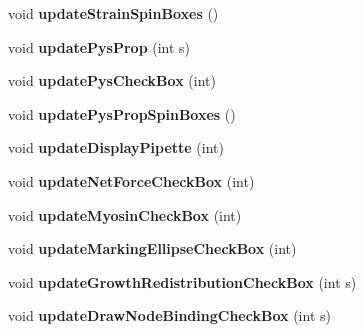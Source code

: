 \begin{DoxyCompactItemize}
\item 
\hypertarget{classMainWindow_a3312d7addf449ffda5fd9f68964d6b61}{}void {\bfseries update\+Strain\+Spin\+Boxes} ()\label{classMainWindow_a3312d7addf449ffda5fd9f68964d6b61}

\item 
\hypertarget{classMainWindow_a524bf8d075a209be107c5ee9cd750bba}{}void {\bfseries update\+Pys\+Prop} (int s)\label{classMainWindow_a524bf8d075a209be107c5ee9cd750bba}

\item 
\hypertarget{classMainWindow_a933538d0ccf6de1298c6e4c7ed223f38}{}void {\bfseries update\+Pys\+Check\+Box} (int)\label{classMainWindow_a933538d0ccf6de1298c6e4c7ed223f38}

\item 
\hypertarget{classMainWindow_a3ee88b5e4474675aec3b55f7a5e38bb2}{}void {\bfseries update\+Pys\+Prop\+Spin\+Boxes} ()\label{classMainWindow_a3ee88b5e4474675aec3b55f7a5e38bb2}

\item 
\hypertarget{classMainWindow_ad30193e1dac5d64c7467e576e238ce03}{}void {\bfseries update\+Display\+Pipette} (int)\label{classMainWindow_ad30193e1dac5d64c7467e576e238ce03}

\item 
\hypertarget{classMainWindow_ac6e570780295db3ff54382cbda1ea4cf}{}void {\bfseries update\+Net\+Force\+Check\+Box} (int)\label{classMainWindow_ac6e570780295db3ff54382cbda1ea4cf}

\item 
\hypertarget{classMainWindow_a6d97f5be9f61304b31db8f83d11f6b8d}{}void {\bfseries update\+Myosin\+Check\+Box} (int)\label{classMainWindow_a6d97f5be9f61304b31db8f83d11f6b8d}

\item 
\hypertarget{classMainWindow_a376c970ba3b5a9b51da3d4cfb175ef0d}{}void {\bfseries update\+Marking\+Ellipse\+Check\+Box} (int)\label{classMainWindow_a376c970ba3b5a9b51da3d4cfb175ef0d}

\item 
\hypertarget{classMainWindow_abc2eba78dba741144ca620013f3e4ca5}{}void {\bfseries update\+Growth\+Redistribution\+Check\+Box} (int s)\label{classMainWindow_abc2eba78dba741144ca620013f3e4ca5}

\item 
\hypertarget{classMainWindow_a42da967bce2041abe677110750d50f61}{}void {\bfseries update\+Draw\+Node\+Binding\+Check\+Box} (int s)\label{classMainWindow_a42da967bce2041abe677110750d50f61}


\end{DoxyCompactItemize}
